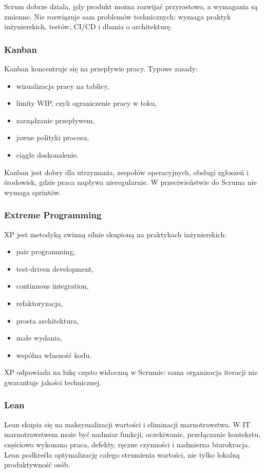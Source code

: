 Scrum dobrze działa, gdy produkt można rozwijać przyrostowo, a wymagania są zmienne. Nie rozwiązuje sam problemów technicznych: wymaga praktyk inżynierskich, testów, CI/CD i dbania o architekturę.

\subsubsection{Kanban}

Kanban koncentruje się na przepływie pracy. Typowe zasady:
\begin{itemize}
  \item wizualizacja pracy na tablicy,
  \item limity WIP, czyli ograniczenie pracy w toku,
  \item zarządzanie przepływem,
  \item jawne polityki procesu,
  \item ciągłe doskonalenie.
\end{itemize}

Kanban jest dobry dla utrzymania, zespołów operacyjnych, obsługi zgłoszeń i środowisk, gdzie praca napływa nieregularnie. W przeciwieństwie do Scruma nie wymaga sprintów.

\subsubsection{Extreme Programming}

XP jest metodyką zwinną silnie skupioną na praktykach inżynierskich:
\begin{itemize}
  \item pair programming,
  \item test-driven development,
  \item continuous integration,
  \item refaktoryzacja,
  \item prosta architektura,
  \item małe wydania,
  \item wspólna własność kodu.
\end{itemize}

XP odpowiada na lukę często widoczną w Scrumie: sama organizacja iteracji nie gwarantuje jakości technicznej.

\subsubsection{Lean}

Lean skupia się na maksymalizacji wartości i eliminacji marnotrawstwa. W IT marnotrawstwem może być nadmiar funkcji, oczekiwanie, przełączanie kontekstu, częściowo wykonana praca, defekty, ręczne czynności i nadmierna biurokracja. Lean podkreśla optymalizację całego strumienia wartości, nie tylko lokalną produktywność osób.

